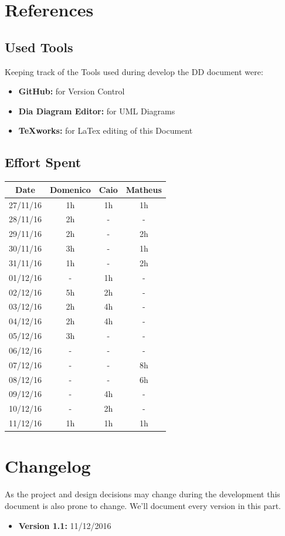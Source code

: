 \documentclass[a4paper]{article}
\begin{document}
\newpage

\section{References}
\subsection{Used Tools}
Keeping track of the Tools used during develop the DD document were:
\begin{itemize}
	\item \textbf{GitHub:} for Version Control
	\item \textbf {Dia Diagram Editor:} for UML Diagrams
	\item \textbf {TeXworks:} for LaTex editing of this Document
\end{itemize}
\newpage
\subsection{Effort Spent}
\begin{tabular}{ | c | c | c | c | }
\hline
	\textbf {Date} & \textbf {Domenico} & \textbf {Caio} & \textbf {Matheus} \\ \hline
	27/11/16& 1h & 1h & 1h  \\ \hline
	28/11/16& 2h & - & - \\ \hline
	29/11/16& 2h & - & 2h\\ \hline
	30/11/16& 3h & - & 1h\\ \hline
	31/11/16& 1h & - & 2h\\ \hline
	01/12/16& - & 1h & - \\ \hline
	02/12/16& 5h & 2h & - \\ \hline
	03/12/16& 2h & 4h & - \\ \hline
	04/12/16& 2h & 4h & - \\ \hline
	05/12/16& 3h & - & - \\ \hline
	06/12/16& - & - & - \\ \hline
	07/12/16& - & - & 8h\\ \hline
	08/12/16& - & - & 6h\\ \hline
	09/12/16& - & 4h & - \\ \hline
	10/12/16& - & 2h & - \\ \hline
	11/12/16& 1h & 1h & 1h \\ \hline
\end{tabular}
\newpage

\section{Changelog}
As the project and design decisions may change during the development this document is also prone to change.
We'll document every version in this part.
\begin{itemize}
\item \textbf {Version 1.1:} 11/12/2016
\end{itemize}
\end{document}
